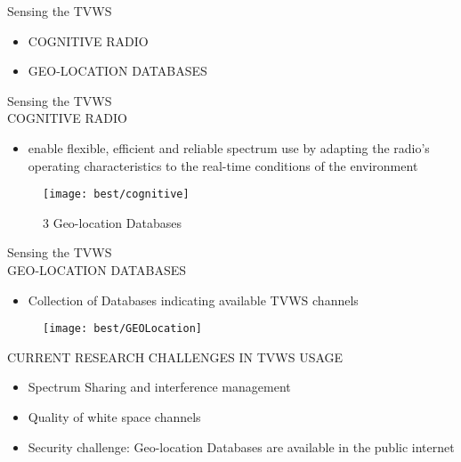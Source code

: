 \documentclass[]{beamer}
\begin{document}
\begin{frame}{Sensing the TVWS}
	\begin{itemize}
		\item COGNITIVE RADIO
	    \item GEO-LOCATION DATABASES
	\end{itemize}	
\end{frame}
\begin{frame}{Sensing the TVWS\\COGNITIVE RADIO}
	\begin{itemize}
		\item {enable flexible, efficient and reliable spectrum use by adapting the radio’s operating characteristics to the real-time conditions of the environment}
	\end{itemize}
	\begin{figure}
\centering
\texttt{[image: best/cognitive]}
\caption{3 Geo-location Databases}
\label{fig:cognitive}
\end{figure}

\end{frame}	
\begin{frame}{Sensing the TVWS\\GEO-LOCATION DATABASES}
	\begin{itemize}
		\item {Collection of Databases indicating available TVWS channels}
	\end{itemize}
	\begin{figure}
\centering
\texttt{[image: best/GEOLocation]}
\caption{}
\label{fig:GEOLocation}
\end{figure}
\end{frame}
\begin{frame}{CURRENT RESEARCH CHALLENGES IN TVWS USAGE}
	\begin{itemize}
		\item {Spectrum Sharing and interference management}
		\item {Quality of white space channels}
		\item {Security challenge: Geo-location Databases are available in the public internet}
	\end{itemize}
\end{frame}
\end{document}
